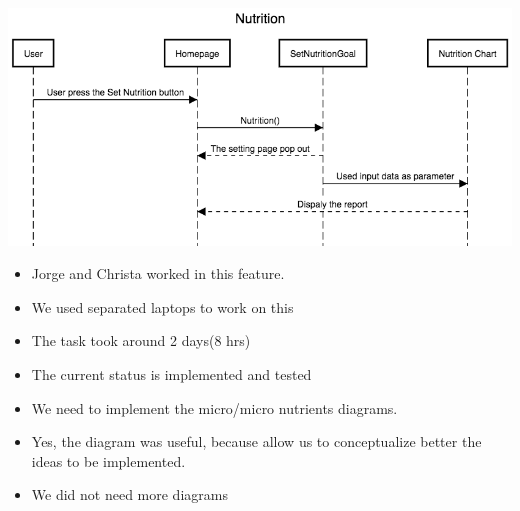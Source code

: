 \documentclass[a4paper]{article}
\begin{document}
\includegraphics[width=\textwidth, height=8 cm]{nutrition.png}
\begin{itemize}
	\item Jorge and Christa worked in this feature. 
	\item We used separated laptops to work on this
    \item The task took around 2 days(8 hrs)
    \item The current status is implemented and tested 
  \item We need to implement the micro/micro nutrients diagrams.
  \item Yes, the diagram was useful, because allow us to conceptualize better the ideas to be implemented.
  \item We did not need more diagrams
\end{itemize}
\end{document}
